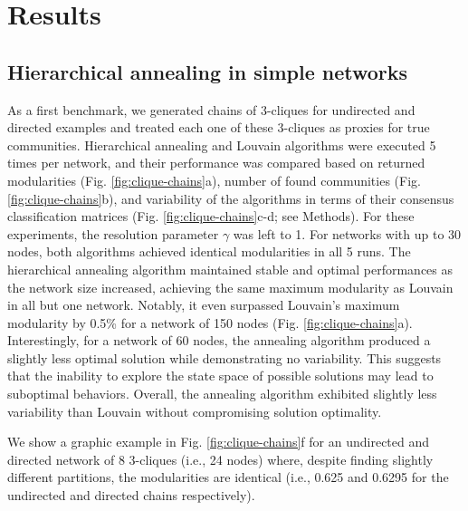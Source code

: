 \documentclass[pdflatex,sn-mathphys-num]{sn-jnl}%
\begin{document}
\section*{Results}
\subsection*{Hierarchical annealing in simple networks}
As a first benchmark, we generated chains of 3-cliques for undirected and directed examples and treated each one of these 3-cliques as proxies for true communities. Hierarchical annealing and Louvain algorithms were executed 5 times per network, and their performance was compared based on returned modularities (Fig. \ref{fig:clique-chains}a), number of found communities (Fig. \ref{fig:clique-chains}b), and variability of the algorithms in terms of their consensus classification matrices (Fig. \ref{fig:clique-chains}c-d; see Methods).  For these experiments, the resolution parameter $\gamma$ was left to 1. For networks with up to 30 nodes, both algorithms achieved identical modularities in all 5 runs. The hierarchical annealing algorithm maintained stable and optimal performances as the network size increased, achieving the same maximum modularity as Louvain in all but one network. Notably, it even surpassed Louvain's maximum modularity by 0.5\% for a network of 150 nodes (Fig. \ref{fig:clique-chains}a). Interestingly, for a network of 60 nodes, the annealing algorithm produced a slightly less optimal solution while demonstrating no variability. This suggests that the inability to explore the state space of possible solutions may lead to suboptimal behaviors. Overall, the annealing algorithm exhibited slightly less variability than Louvain without compromising solution optimality. 

We show a graphic example in Fig. \ref{fig:clique-chains}f for an undirected and directed network of 8 3-cliques (i.e., 24 nodes) where, despite finding slightly different partitions, the modularities are identical (i.e., 0.625 and 0.6295 for the undirected and directed chains respectively).
\end{document}
